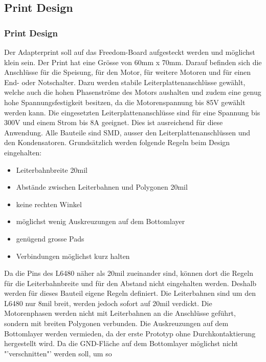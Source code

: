     \subsection{Print Design} \label{sec:PrintDesign}   
    \fi
    \ifEMBED
    \subsubsection{Print Design} \label{sec:PrintDesigna}
    \fi
    Der Adapterprint soll auf das Freedom-Board aufgesteckt werden und 
    möglichst klein sein. Der Print hat eine Grösse von 60mm x 70mm. Darauf 
    befinden sich die Anschlüsse für die Speisung, für den Motor, für weitere 
    Motoren und für einen End- oder Notschalter. Dazu werden stabile 
    Leiterplattenanschlüsse gewählt, welche auch die hohen Phasenströme des 
    Motors aushalten und zudem eine genug hohe Spannungsfestigkeit besitzen, 
    da die Motorenspannung bis 85V gewählt werden kann. Die eingesetzten 
    Leiterplattenanschlüsse sind für eine Spannung bis 300V und einem Strom 
    bis 8A geeignet. Dies ist ausreichend für diese Anwendung. Alle Bauteile 
    sind SMD, ausser den Leiterplattenanschlüssen und den Kondensatoren.
    \newpage
    Grundsätzlich werden folgende Regeln beim Design eingehalten: 
    \begin{itemize}
        \item Leiterbahnbreite 20mil
        \item Abstände zwischen Leiterbahnen und Polygonen 20mil
        \item keine rechten Winkel
        \item möglichst wenig Auskreuzungen auf dem Bottomlayer
        \item genügend grosse Pads 
        \item Verbindungen möglichst kurz halten
    \end{itemize}
    Da die Pins des L6480 näher als 20mil zueinander sind, können dort die 
    Regeln für die Leiterbahnbreite und für den Abstand nicht eingehalten 
    werden. Deshalb werden für dieses Bauteil eigene Regeln definiert. Die 
    Leiterbahnen sind um den L6480 nur 8mil breit, werden jedoch sofort auf 
    20mil verdickt. Die Motorenphasen werden nicht mit Leiterbahnen an die 
    Anschlüsse geführt, sondern mit breiten Polygonen verbunden. Die 
    Auskreuzungen auf dem Bottomlayer werden vermieden, da der erste Prototyp 
    ohne Durchkontaktierung hergestellt wird. Da die GND-Fläche auf dem 
    Bottomlayer möglichst nicht "'verschnitten"' werden soll, um so 
